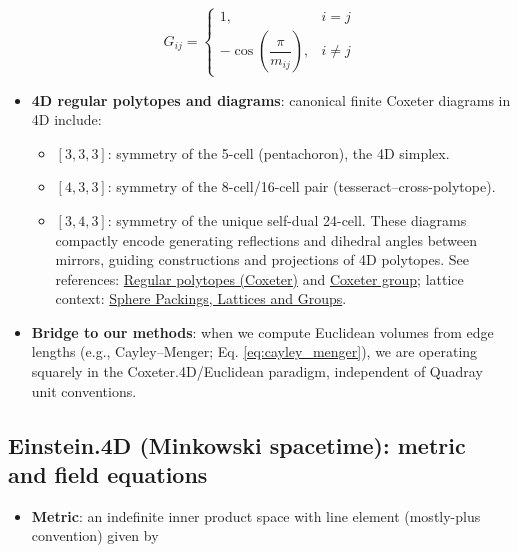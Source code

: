 \documentclass[
  10pt,
]{article}
\providecommand{\tightlist}{%
  \setlength{\itemsep}{0pt}\setlength{\parskip}{0pt}}
\begin{document}
\begin{equation}\label{eq:coxeter_gram}
G_{ij} = \begin{cases}
1, & i=j \\
-\cos\!\left(\dfrac{\pi}{m_{ij}}\right), & i\ne j
\end{cases}
\end{equation}

\begin{itemize}
\tightlist
\item
  \textbf{4D regular polytopes and diagrams}: canonical finite Coxeter
  diagrams in 4D include:

  \begin{itemize}
  \tightlist
  \item
    \([3,3,3]\): symmetry of the 5-cell (pentachoron), the 4D simplex.
  \item
    \([4,3,3]\): symmetry of the 8-cell/16-cell pair
    (tesseract--cross-polytope).
  \item
    \([3,4,3]\): symmetry of the unique self-dual 24-cell. These
    diagrams compactly encode generating reflections and dihedral angles
    between mirrors, guiding constructions and projections of 4D
    polytopes. See references:
    \href{https://en.wikipedia.org/wiki/Regular_polytope}{Regular
    polytopes (Coxeter)} and
    \href{https://en.wikipedia.org/wiki/Coxeter_group}{Coxeter group};
    lattice context:
    \href{https://link.springer.com/book/10.1007/978-1-4757-6568-7}{Sphere
    Packings, Lattices and Groups}.
  \end{itemize}
\item
  \textbf{Bridge to our methods}: when we compute Euclidean volumes from
  edge lengths (e.g., Cayley--Menger; Eq. \eqref{eq:cayley_menger}), we
  are operating squarely in the Coxeter.4D/Euclidean paradigm,
  independent of Quadray unit conventions.
\end{itemize}

\hypertarget{einstein.4d-minkowski-spacetime-metric-and-field-equations}{%
\subsection{Einstein.4D (Minkowski spacetime): metric and field
equations}\label{einstein.4d-minkowski-spacetime-metric-and-field-equations}}

\begin{itemize}
\tightlist
\item
  \textbf{Metric}: an indefinite inner product space with line element
  (mostly-plus convention) given by
\end{itemize}
\end{document}
